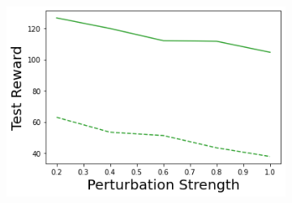 \begin{figure}
\begin{subfigure}{.24\textwidth}
    \end{subfigure}
    \begin{subfigure}{.24\textwidth}
        \includegraphics[width=\textwidth]{sections/011_icml2022/resources/transition_shift-PostNet-CartPoleShift-v0-mean_reward_.png}
    \end{subfigure}
    

\end{figure}
